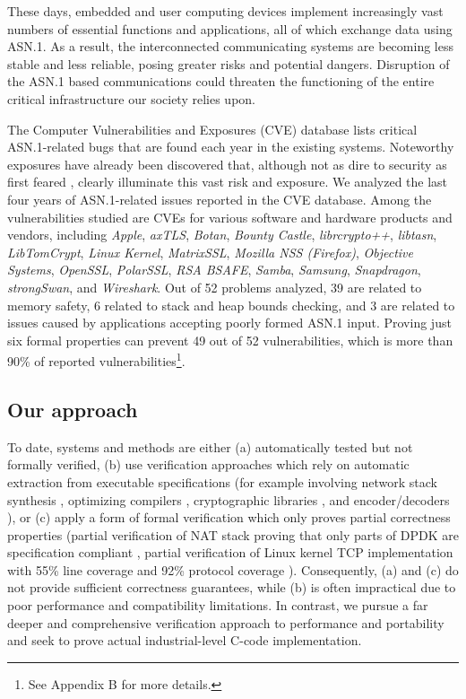 \documentclass[acmsmall,nonacm]{acmart}
\begin{document}
These days, embedded and user computing devices  implement increasingly vast numbers of essential functions and applications, all of which
exchange data using ASN.1. As a result, the interconnected communicating
systems are becoming less stable and less reliable, posing greater risks and
potential dangers. Disruption of the ASN.1 based communications
could threaten the functioning of the entire critical infrastructure our
society relies upon.


The Computer Vulnerabilities and Exposures (CVE) database \cite{CVE}
lists critical ASN.1-related bugs that are found each year in the existing
systems. Noteworthy exposures have already been discovered 
\cite{OpenSSLMemoryCorruption} that, although not as dire to security
as first feared \cite{ASN1Flaw}, clearly illuminate this vast risk and exposure. We analyzed the last four years of
ASN.1-related issues reported in the CVE database. %
Among the vulnerabilities studied
are CVEs for various software and hardware products and vendors,
including \textit{Apple}, \textit{axTLS}, \textit{Botan},
\textit{Bounty Castle}, \textit{librcrypto++}, \textit{libtasn},
\textit{LibTomCrypt}, \textit{Linux Kernel}, \textit{MatrixSSL},
\textit{Mozilla NSS (Firefox)}, \textit{Objective Systems},
\textit{OpenSSL}, \textit{PolarSSL}, \textit{RSA BSAFE},
\textit{Samba}, \textit{Samsung}, \textit{Snapdragon},
\textit{strongSwan}, and \textit{Wireshark}. Out of 52 problems analyzed, 39 are related to memory safety, 6 related to
stack and heap bounds checking, and 3 are related to issues caused by
applications accepting poorly formed ASN.1 input. Proving just
six formal properties can prevent 49 out of 52
vulnerabilities, which is more than 90\% of reported
vulnerabilities\footnote{See Appendix B for more details.}.

\subsection{Our approach}
\label{sec:approach}
To date, systems and methods are either (a) automatically tested but not
formally verified, (b) use verification approaches which rely on
automatic extraction from executable specifications (for example
involving network stack synthesis \cite{VNSSforSel4}, optimizing compilers
\cite{CompCert}, cryptographic libraries \cite{HACL}, and
encoder/decoders \cite{Narcissus}), or (c) apply a form of formal
verification which only proves partial correctness properties (partial
verification of NAT stack proving that only parts of DPDK are specification
compliant \cite{NAT}, partial verification of Linux kernel TCP
implementation with 55\% line coverage and 92\% protocol coverage
\cite{NSDI}). Consequently, (a) and (c) do not provide sufficient
correctness guarantees, while (b) is often impractical due to poor
performance and compatibility limitations. In contrast, we pursue a
far deeper and comprehensive verification approach to performance and
portability and seek to prove actual industrial-level C-code
implementation.
\end{document}
